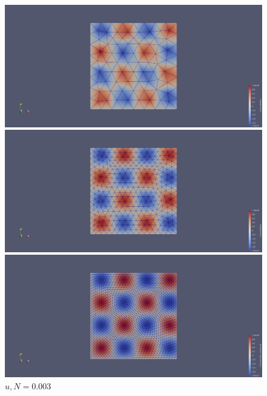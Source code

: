 \documentclass{article}
\begin{document}
\begin{figure}[!htb]
	\includegraphics[width=\textwidth]{img/32.png}
	\caption{$u, d = 0.15$}
	\endminipage\hfill
	\includegraphics[width=\textwidth]{img/64.png}
	\caption{$u, N = 0.076$}
	\endminipage\hfill
	\includegraphics[width=\textwidth]{img/128.png}
	\caption{$u, N = 0.003$}
	\endminipage
\end{figure}
\end{document}
